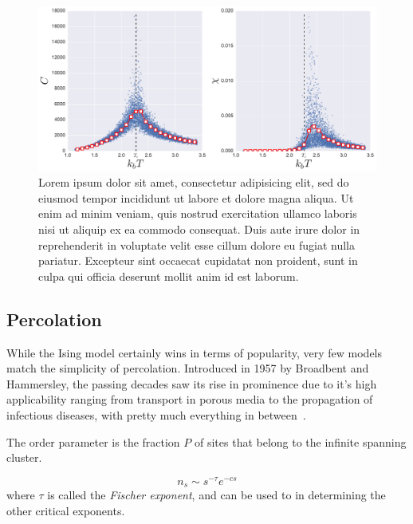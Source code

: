 \begin{figure}
\begin{center}
    \includegraphics[width=\textwidth]{chapters/ch2-crit/figs/ising_cx}
\end{center}
\caption{Lorem ipsum dolor sit amet, consectetur adipisicing elit, sed do
    eiusmod tempor incididunt ut labore et dolore magna aliqua. Ut enim ad
    minim veniam, quis nostrud exercitation ullamco laboris nisi ut aliquip ex
    ea commodo consequat. Duis aute irure dolor in reprehenderit in voluptate
    velit esse cillum dolore eu fugiat nulla pariatur. Excepteur sint occaecat
    cupidatat non proident, sunt in culpa qui officia deserunt mollit anim id
    est laborum.}
\label{fig:ising_cx}
\end{figure}



\subsection{Percolation}
\label{sec:perc}

While the Ising model certainly wins in terms of popularity, very few models
match the simplicity of percolation. Introduced in 1957 by Broadbent and
Hammersley, the passing decades saw its rise in prominence due to it's high
applicability ranging from transport in porous media to the propagation of
infectious diseases, with pretty much everything in between~\cite{Stauffer1994}.

The order parameter is the fraction $P$ of sites that belong to the infinite
spanning cluster.

\begin{equation}
    n_s\sim s^{-\tau}e^{-cs}
\end{equation}
where $\tau$ is called the \textit{Fischer exponent}, and can be used to
in determining the other critical exponents.

